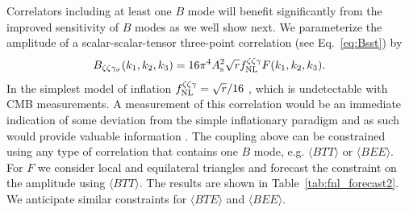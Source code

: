 Correlators including at least one $B$ mode will benefit significantly from the improved sensitivity of $B$ modes as we well show next. We parameterize the amplitude of a scalar-scalar-tensor three-point correlation (see Eq.~\ref{eq:Bsst}) by \cite{Meerburg:2016ecv}
\begin{equation}
B_{\zeta\zeta\gamma_\sigma}(k_1,k_2,k_3)= 16 \pi^4 A_{\rm s}^2 \sqrt{r}f_\mathrm{NL}^{\zeta\zeta\gamma} F(k_1,k_2,k_3).
\end{equation} 
In the simplest model of inflation $f^{\zeta \zeta\gamma }_{\rm NL} = \sqrt{r}/16$ \cite{Maldacena:2002vr,Maldacena:2011nz}, which is undetectable with CMB measurements. A measurement of this correlation would be an immediate indication of some deviation from the simple inflationary paradigm and as such would provide valuable information \cite{Bordin:2016ruc,Dimastrogiovanni:2015pla}. The coupling above can be constrained using any type of correlation that contains one $B$ mode, e.g. $\langle BTT \rangle$ or $\langle BEE\rangle$. For $F$ we consider local and equilateral triangles and forecast the constraint on the amplitude using $\langle BTT\rangle$. The results are shown in Table~\ref{tab:fnl_forecast2}. We anticipate similar constraints for $\langle BTE\rangle $ and $\langle BEE\rangle$. 





